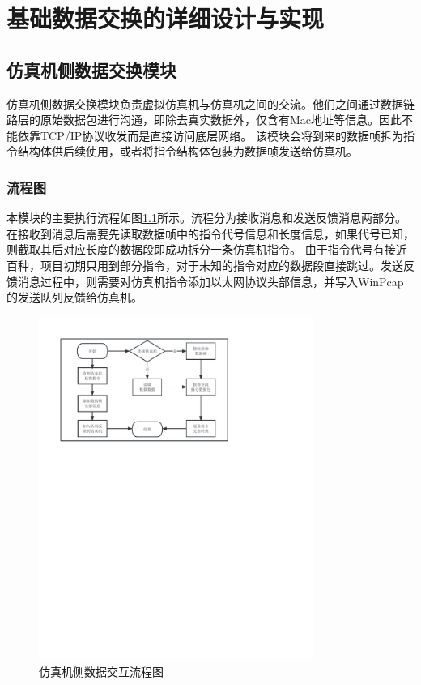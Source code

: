 \chapter{基础数据交换的详细设计与实现}
\section{仿真机侧数据交换模块}
仿真机侧数据交换模块负责虚拟仿真机与仿真机之间的交流。他们之间通过数据链路层的原始数据包进行沟通，即除去真实数据外，仅含有Mac地址等信息。因此不能依靠TCP/IP协议收发而是直接访问底层网络。
该模块会将到来的数据帧拆为指令结构体供后续使用，或者将指令结构体包装为数据帧发送给仿真机。
\subsection{流程图}
\par
本模块的主要执行流程如图\ref{module11}所示。流程分为接收消息和发送反馈消息两部分。在接收到消息后需要先读取数据帧中的指令代号信息和长度信息，如果代号已知，则截取其后对应长度的数据段即成功拆分一条仿真机指令。
由于指令代号有接近百种，项目初期只用到部分指令，对于未知的指令对应的数据段直接跳过。发送反馈消息过程中，则需要对仿真机指令添加以太网协议头部信息，并写入WinPcap的发送队列反馈给仿真机。
\begin{figure}[h!]
    \begin{center}
        \includegraphics[width=0.8\textwidth]{pictures/flowchart1.pdf}
        \caption{仿真机侧数据交互流程图}
        \label{module11}
    \end{center}
\end{figure}

